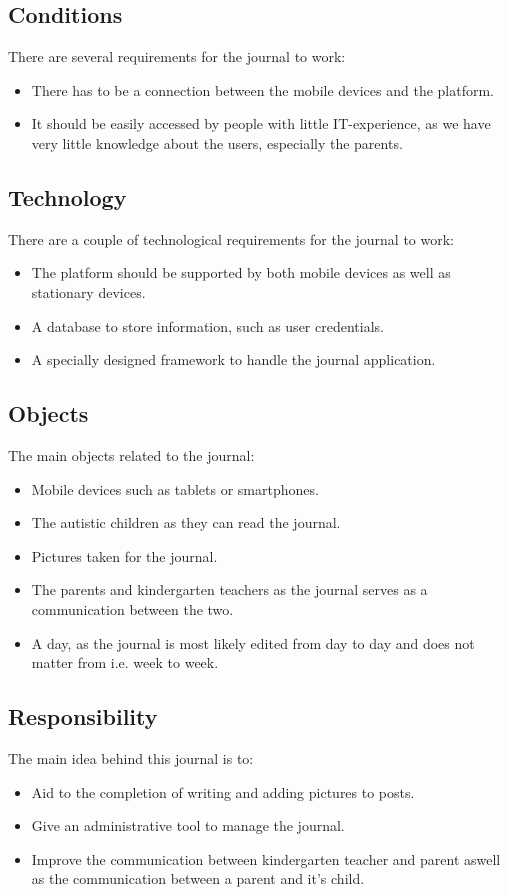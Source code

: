 \subsection{Conditions}
There are several requirements for the journal to work:
\begin{itemize}
	\item{There has to be a connection between the mobile devices and the platform.}
	\item{It should be easily accessed by people with little IT-experience, as we have very little knowledge about the users, especially the parents.}
\end{itemize}

\subsection{Technology}
There are a couple of technological requirements for the journal to work:
\begin{itemize}
	\item{The platform should be supported by both mobile devices as well as stationary devices.}
	\item{A database to store information, such as user credentials.}
  	\item{A specially designed framework to handle the journal application.}
	\end{itemize}

\subsection{Objects}
The main objects related to the journal:
\begin{itemize}
	\item{Mobile devices such as tablets or smartphones.}
	\item{The autistic children as they can read the journal.}
	\item{Pictures taken for the journal.}
	\item{The parents and kindergarten teachers as the journal serves as a communication between the two.}
	\item{A day, as the journal is most likely edited from day to day and does not matter from i.e. week to week.}
\end{itemize}

\subsection{Responsibility} 
The main idea behind this journal is to:
\begin{itemize}
	\item{Aid to the completion of writing and adding pictures to posts.}
	\item{Give an administrative tool to manage the journal.}
	\item{Improve the communication between kindergarten teacher and parent aswell as the communication between a parent and it's child.}
\end{itemize}

